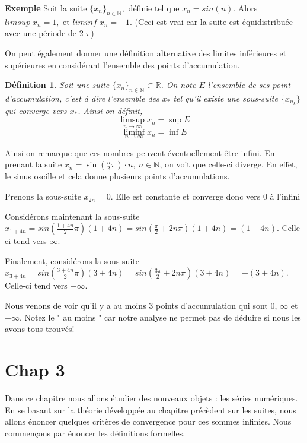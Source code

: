 \documentclass[a4paper, 12pt, french, twoside]{article}
\newtheorem{defi}[theorem]{Définition}
\newcommand{\Nn}{{\mathbb{N}}}
\newcommand{\Rr}{{\mathbb{R}}}
\begin{document}
\textbf{Exemple} Soit la suite $\{x_n\}_{n\in \Nn},$ définie tel que $x_n = sin(n).$ Alors $limsup \; x_n = 1,$ et $liminf \; x_n = -1.$ (Ceci est vrai car la suite est équidistribuée avec une période de 2 $\pi$)

On peut également donner une définition alternative des limites inférieures et supérieures en considérant l'ensemble des points d'accumulation. 
\begin{defi}
    Soit une suite $\{x_n\}_{n\in \Nn}\subset \Rr$. On note $E$ l'ensemble de ses point d'accumulation, c'est à dire l'ensemble des $x_*$ tel qu'il existe une sous-suite $\{x_{n_k}\}$ qui converge vers $x_*$. Ainsi on définit,
        \[
    \limsup_{n \rightarrow \infty} x_n = \sup E
    \]
    \[
    \liminf_{n \rightarrow \infty} x_n = \inf E
    \]
\end{defi}
 Ainsi on remarque que ces nombres peuvent éventuellement être infini. 
En prenant la suite $x_n=\sin(\frac{n}{2}\pi)\cdot n, ~ n\in \Nn$, on voit que celle-ci diverge. En effet, le sinus oscille et cela donne plusieurs points d'accumulations.

Prenons la sous-suite $x_{2n}=0$. Elle est constante et converge donc vers 0 à l'infini

Considérons maintenant la sous-suite $x_{1+4n}=sin(\frac{1+4n}{2}\pi)(1+4n)=sin(\frac{\pi}{2}+2n\pi)(1+4n)=(1+4n)$. Celle-ci tend vers $\infty$. 

Finalement, considérons la sous-suite $x_{3+4n}=sin(\frac{3+4n}{2}\pi)(3+4n)=sin(\frac{3\pi}{2}+2n\pi)(3+4n)=-(3+4n)$. Celle-ci tend vers $-\infty$.

Nous venons de voir qu'il y a au moins 3 points d'accumulation qui sont 0, $\infty$ et $-\infty$. Notez le " au moins " car notre analyse ne permet pas de déduire si nous les avons tous trouvés! 
 
\newpage 

\section{Chap 3}
Dans ce chapitre nous allons étudier des nouveaux objets : les séries numériques. En se basant sur la théorie développée au chapitre précèdent sur les suites, nous allons énoncer quelques critères de convergence pour ces sommes infinies. Nous commençons par énoncer les définitions formelles. 
\end{document}
